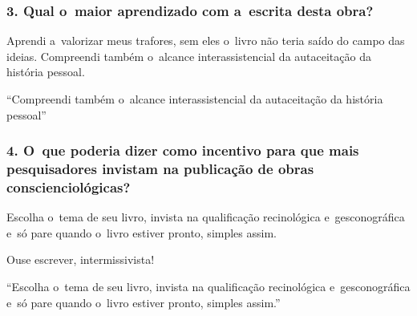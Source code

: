 \documentclass{gescons}
\begin{document}
\begin{multicols}{2}
\subsubsection{3. Qual o~maior aprendizado com a~escrita desta obra?}

Aprendi a~valorizar meus trafores, sem eles o~livro não teria saído do campo das ideias. Compreendi também o~alcance interassistencial da autaceitação da história pessoal.

\begin{pullquote}
``Compreendi também o~alcance interassistencial da autaceitação da história pessoal''
\end{pullquote}


\subsubsection{4. O~que poderia dizer como incentivo para que mais pesquisadores invistam na publicação de obras conscienciológicas?}

Escolha o~tema de seu livro, invista na qualificação recinológica e~gesconográfica e~só pare quando o~livro estiver pronto, simples assim. 

Ouse escrever, intermissivista!

\begin{pullquote}
``Escolha o~tema de seu livro, invista na qualificação recinológica e~gesconográfica e~só pare quando o~livro estiver pronto, simples assim.''
\end{pullquote}



    
    \end{multicols}
\end{document}
